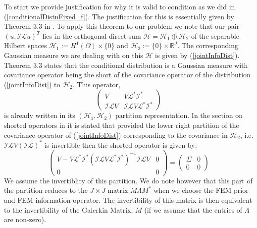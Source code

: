 \documentclass{article}
\theoremstyle{definition}
\theoremstyle{remark}
\begin{document}
To start we provide justification for why it is valid to condition as we did in (\ref{conditionalDistnFixed_f}). The justification for this is essentially given by Theorem 3.3 in \cite{owhadi2015conditioning}. To apply this theorem to our problem we note that our pair $(u,\mathcal{I}\mathcal{L}u)^{T}$ lies in the orthogonal direct sum $\mathcal{H}=\mathcal{H}_1\oplus\mathcal{H}_{2}$ of the separable Hilbert spaces $\mathcal{H}_{1}:=H^{1}(\Omega)\times\{0\}$ and $\mathcal{H}_{2}:=\{0\}\times\mathbb{R}^{J}$. The corresponding Gaussian measure we are dealing with on this $\mathcal{H}$ is given by (\ref{jointInfoDist}). Theorem 3.3 states that the conditional distribution is a Gaussian measure with covariance operator being the short of the covariance operator of the distribution (\ref{jointInfoDist}) to $\mathcal{H}_{2}$. This operator,
\begin{equation}
    \begin{pmatrix}
    V & V\mathcal{L}^{*}\mathcal{I}^{*} \\
    \mathcal{I}\mathcal{L}V & \mathcal{I}\mathcal{L}V\mathcal{L}^{*}\mathcal{I}^{*}
    \end{pmatrix}
\end{equation}
is already written in its $(\mathcal{H}_1,\mathcal{H}_2)$ partition representation. In the section on shorted operators in \cite{owhadi2015conditioning} it is stated that provided the lower right partition of the covariance operator of (\ref{jointInfoDist}) corresponding to the covariance in $\mathcal{H}_2$, i.e. $\mathcal{I}\mathcal{L}V(\mathcal{I}\mathcal{L})^{*}$ is invertible then the shorted operator is given by:
\begin{equation}
    \begin{pmatrix}
        V-V\mathcal{L}^{*}\mathcal{I}^{*}(\mathcal{I}\mathcal{L}V\mathcal{L}^{*}\mathcal{I}^{*})^{-1}\mathcal{I}\mathcal{L}V & 0 \\
        0 & 0
    \end{pmatrix}=\begin{pmatrix}
                    \Sigma & 0 \\
                    0 & 0
                  \end{pmatrix}
\end{equation}
We assume the invertiblity of this partition. We do note however that this part of the partition reduces to the $J\times J$ matrix $M\Lambda M^{*}$ when we choose the FEM prior and FEM information operator. The invertibility of this matrix is then equivalent to the invertibility of the Galerkin Matrix, $M$ (if we assume that the entries of $\Lambda$ are non-zero). \\
\end{document}
